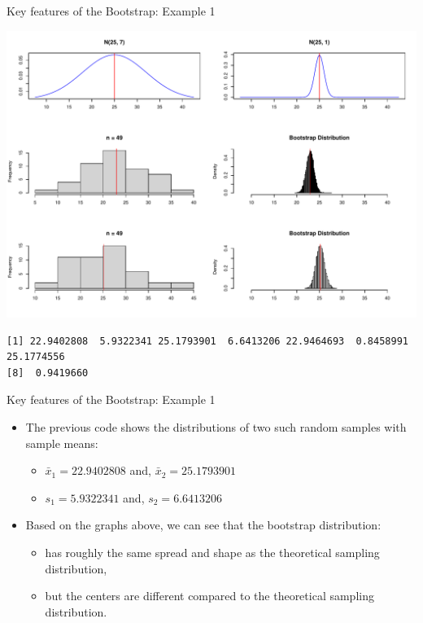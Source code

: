 \documentclass[
  ignorenonframetext,
]{beamer}
\providecommand{\tightlist}{%
  \setlength{\itemsep}{0pt}\setlength{\parskip}{0pt}}
\begin{document}
\begin{frame}[fragile]{Key features of the Bootstrap: Example 1}
\protect\hypertarget{key-features-of-the-bootstrap-example-1-2}{}
\tiny

\begin{center}\includegraphics[width=0.9\linewidth,height=0.75\textheight]{Week10_Lect_files/figure-beamer/unnamed-chunk-3-1} \end{center}

\begin{verbatim}
[1] 22.9402808  5.9322341 25.1793901  6.6413206 22.9464693  0.8458991 25.1774556
[8]  0.9419660
\end{verbatim}

\normalsize
\end{frame}

\begin{frame}{Key features of the Bootstrap: Example 1}
\protect\hypertarget{key-features-of-the-bootstrap-example-1-3}{}
\begin{itemize}
\item
  The previous code shows the distributions of two such random samples
  with sample means:

  \begin{itemize}
  \tightlist
  \item
    \(\bar{x}_1=22.9402808\) and, \(\bar{x}_2=25.1793901\)
  \item
    \(s_1= 5.9322341\) and, \(s_2= 6.6413206\)
  \end{itemize}
\item
  Based on the graphs above, we can see that the bootstrap distribution:

  \begin{itemize}
  \tightlist
  \item
    has roughly the same spread and shape as the theoretical sampling
    distribution,
  \item
    but the centers are different compared to the theoretical sampling
    distribution.
  \end{itemize}
\end{itemize}
\end{frame}
\end{document}
